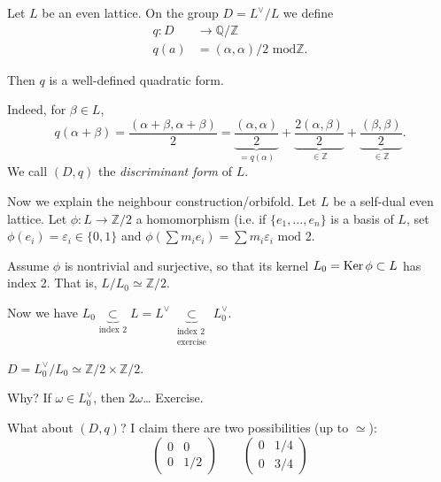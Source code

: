 \begin{remark}
\label{remark-discriminant-form}
Let $L$ be an even lattice.
On the group $D=L^\vee/L$ we define
$$
\begin{aligned}
q: D &\longrightarrow \mathbb{Q}/\mathbb{Z}
\\
q(a) &=(\alpha,\alpha)/2 \text{ mod
}\mathbb{Z}.
\end{aligned}
$$

\noindent
Then $q$ is a well-defined quadratic form.

Indeed, for $\beta \in L$,
$$
q(\alpha+\beta)=\frac{(\alpha+\beta,\alpha+
\beta)}{2}
=\underbrace{\frac{(\alpha,\alpha)}{2}}_{=
q(\alpha)}
+\underbrace{\frac{2(\alpha,\beta)}{2}}_{\in
\mathbb{Z}}
+\underbrace{\frac{(\beta,\beta)}{2}}_{\in
\mathbb{Z}}.
$$
We call $(D,q)$ the {\it discriminant form}
of $L$.
\end{remark}

\medskip\noindent
Now we explain the neighbour
construction/orbifold.
Let $L$ be a self-dual even lattice.
Let $\phi:L \to \mathbb{Z}/2$ a homomorphism
(i.e. if $\{e_1,\ldots,e_n\}$ is a basis of
$L$,
set $\phi(e_i)=\varepsilon_i \in \{0,1\}$
and $\phi(\sum m_i e_i)=\sum m_i
\varepsilon_i \text{ mod }2$.

Assume $\phi$ is nontrivial and surjective,
so that its kernel
$L_0 = \mathop{\mathrm{Ker}} \phi \subset L$ has index 2.
That is, $L/L_0 \simeq \mathbb{Z}/2$.

Now we have $L_0 \underbrace{\subset
}_{\text{index 2}}L
= L^\vee
\underbrace{\subset}_{\substack{\text{index
2} \\ \text{exercise}}}
L_0^\vee$.

\begin{remark}
\label{remark-discriminant-iso}
$D=L_0^\vee/L_0 \simeq
\mathbb{Z}/2\times\mathbb{Z}/2$.
\end{remark}

\noindent
Why? If $\omega \in L_0^\vee$, then
$2\omega$… Exercise.

What about $(D,q)$? I claim there are two
possibilities
(up to $\simeq$):
\begin{equation}
\label{equation-cases}
\begin{pmatrix}
0&0\\
0&1/2
\end{pmatrix}\qquad
\begin{pmatrix}
0&1/4\\
0&3/4
\end{pmatrix}
\end{equation}


